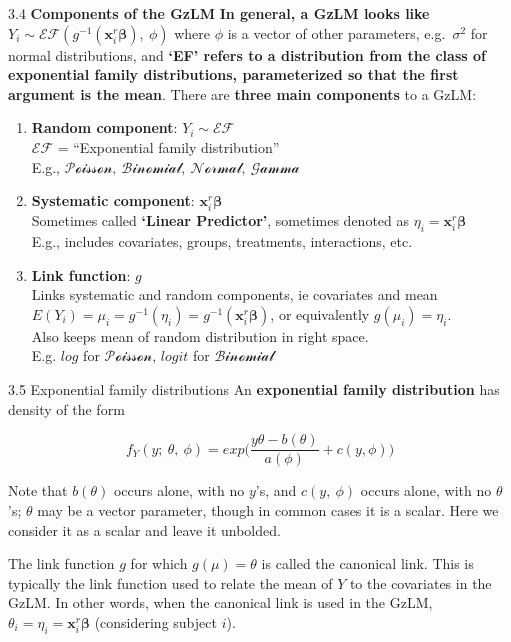 \documentclass[
  9pt,
  ignorenonframetext,
]{beamer}
\begin{document}
\begin{frame}{3.4 \textbf{Components of the GzLM}}
\protect\hypertarget{components-of-the-gzlm}{}
\textbf{In general, a GzLM looks like
\(Y_i \sim \mathcal {EF}(g^{-1} (\pmb x_i^r \pmb \beta),\ \phi)\)} where
\(\phi\) is a vector of other parameters, e.g.~\(\sigma^2\) for normal
distributions, and \textbf{`EF' refers to a distribution from the class
of exponential family distributions, parameterized so that the first
argument is the mean}. There are \textbf{three main components} to a
GzLM:

\begin{enumerate}
\item
  \textbf{Random component}: \(Y_i\sim \mathcal {EF}\)\\
  \textbf{\(\mathcal {EF}\)} = ``Exponential family distribution''\\
  E.g., \(\mathcal {Poisson ,\ Binomial,\ Normal,\ Gamma}\)
\item
  \textbf{Systematic component}: \(\pmb x_i^r \pmb \beta\)\\
  Sometimes called \textbf{`Linear Predictor'}, sometimes denoted as
  \(\eta_i=\pmb x_i^r \pmb \beta\)\\
  E.g., includes covariates, groups, treatments, interactions, etc.
\item
  \textbf{Link function}: \(g\)\\
  Links systematic and random components, ie covariates and mean\\
  \(E(Y_i)=\mu_i=g^{-1} (\eta_i)=g^{-1} (\pmb x_i^r \pmb \beta)\), or
  equivalently \(g(\mu_i)=\eta_i\).\\
  Also keeps mean of random distribution in right space.\\
  E.g. \(log\) for \(\mathcal {Poisson}\), \(logit\) for
  \(\mathcal {Binomial}\)
\end{enumerate}
\end{frame}

\begin{frame}{3.5 Exponential family distributions}
\protect\hypertarget{exponential-family-distributions}{}
An \textbf{exponential family distribution} has density of the form

\[
f_Y (y;\ \theta,\ \phi)=exp\Big(\frac {y\theta-b(\theta)} {a(\phi)} +c(y,\phi)\Big)
\]

Note that \(b(\theta)\) occurs alone, with no \(y\)'s, and
\(c(y,\ \phi)\) occurs alone, with no \(\theta\)'s; \(\theta\) may be a
vector parameter, though in common cases it is a scalar. Here we
consider it as a scalar and leave it unbolded.

The link function \(g\) for which \(g(\mu)=\theta\) is called the
canonical link. This is typically the link function used to relate the
mean of \(Y\) to the covariates in the GzLM. In other words, when the
canonical link is used in the GzLM,
\(\theta_i=\eta_i=\pmb x_i^r \pmb \beta\) (considering subject \(i\)).
\end{frame}
\end{document}
